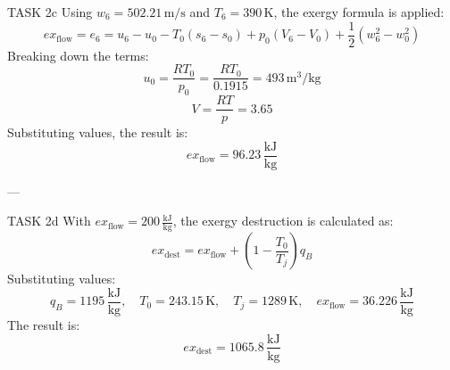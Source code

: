 TASK 2c  
Using \( w_6 = 502.21 \, \text{m/s} \) and \( T_6 = 390 \, \text{K} \), the exergy formula is applied:  
\[
ex_{\text{flow}} = e_6 = u_6 - u_0 - T_0 (s_6 - s_0) + p_0 (V_6 - V_0) + \frac{1}{2} (w_6^2 - w_0^2)
\]  
Breaking down the terms:  
\[
u_0 = \frac{RT_0}{p_0} = \frac{RT_0}{0.1915} = 493 \, \text{m}^3/\text{kg}
\]  
\[
V = \frac{RT}{p} = 3.65
\]  
Substituting values, the result is:  
\[
ex_{\text{flow}} = 96.23 \, \frac{\text{kJ}}{\text{kg}}
\]  

---

TASK 2d  
With \( ex_{\text{flow}} = 200 \, \frac{\text{kJ}}{\text{kg}} \), the exergy destruction is calculated as:  
\[
ex_{\text{dest}} = ex_{\text{flow}} + \left(1 - \frac{T_0}{T_j}\right) q_B
\]  
Substituting values:  
\[
q_B = 1195 \, \frac{\text{kJ}}{\text{kg}}, \quad T_0 = 243.15 \, \text{K}, \quad T_j = 1289 \, \text{K}, \quad ex_{\text{flow}} = 36.226 \, \frac{\text{kJ}}{\text{kg}}
\]  
The result is:  
\[
ex_{\text{dest}} = 1065.8 \, \frac{\text{kJ}}{\text{kg}}
\]